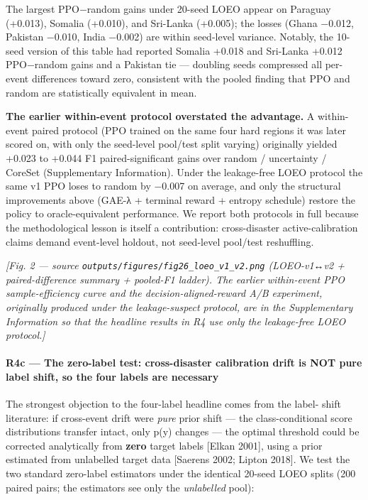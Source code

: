 The largest PPO−random gains under 20-seed LOEO appear on Paraguay
(+0.013), Somalia (+0.010), and Sri-Lanka (+0.005); the losses (Ghana
−0.012, Pakistan −0.010, India −0.002) are within seed-level variance.
Notably, the 10-seed version of this table had reported Somalia +0.018
and Sri-Lanka +0.012 PPO−random gains and a Pakistan tie --- doubling
seeds compressed all per-event differences toward zero, consistent with
the pooled finding that PPO and random are statistically equivalent
in mean.

\textbf{The earlier within-event protocol overstated the advantage.} A within-
event paired protocol (PPO trained on the same four hard regions it was
later scored on, with only the seed-level pool/test split varying)
originally yielded
+0.023 to +0.044 F1 paired-significant gains over random / uncertainty /
CoreSet (Supplementary Information). Under the leakage-free LOEO protocol the same
v1 PPO loses to random by −0.007 on average, and only the structural
improvements above (GAE-λ + terminal reward + entropy schedule) restore the
policy to oracle-equivalent performance. We report both protocols in full
because the methodological lesson is itself a contribution: cross-disaster
active-calibration claims demand event-level holdout, not seed-level
pool/test reshuffling.

\emph{{[}Fig. 2 --- source \texttt{outputs/figures/fig26\_loeo\_v1\_v2.png} (LOEO-v1↔v2 +
paired-difference summary + pooled-F1 ladder). The earlier within-event
PPO sample-efficiency curve and the decision-aligned-reward A/B
experiment, originally produced under the leakage-suspect protocol, are
in the Supplementary Information so that the headline results in R4 use
only the leakage-free LOEO protocol.{]}}

\paragraph{R4c --- The zero-label test: cross-disaster calibration drift is NOT pure label shift, so the four labels are necessary}\label{r4c-the-zero-label-test-cross-disaster-calibration-drift-is-not-pure-label-shift-so-the-four-labels-are-necessary}

The strongest objection to the four-label headline comes from the label-
shift literature: if cross-event drift were \emph{pure} prior shift --- the
class-conditional score distributions transfer intact, only p(y)
changes --- the optimal threshold could be corrected analytically from
\textbf{zero} target labels {[}Elkan 2001{]}, using a prior estimated from
unlabelled target data {[}Saerens 2002; Lipton 2018{]}. We test the two
standard zero-label estimators under the identical 20-seed LOEO splits
(200 paired pairs; the estimators see only the \emph{unlabelled} pool):


